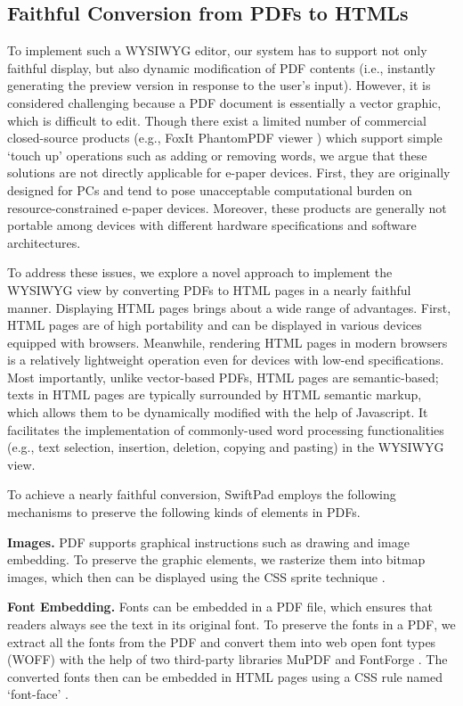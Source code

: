 \documentclass[]{sigchi}
\begin{document}
\subsection{Faithful Conversion from PDFs to HTMLs}
To implement such a WYSIWYG editor, our system has to support not only faithful display, but also dynamic modification of PDF contents (i.e., instantly generating the preview version in response to the user's input). 
However, it is considered challenging because a PDF document is essentially a vector graphic, which is difficult to edit.
Though there exist a limited number of commercial closed-source products (e.g., FoxIt PhantomPDF viewer \cite{foxitreader}) which support simple `touch
up' operations such as adding or removing words, we argue that these solutions are not directly applicable for e-paper devices. First, they are originally designed for PCs and tend to pose unacceptable computational burden on resource-constrained e-paper devices. Moreover, these products are generally not portable among devices with different hardware specifications and software architectures.


To address these issues, we explore a novel approach to implement the WYSIWYG view by converting PDFs to HTML pages in a nearly faithful manner. Displaying HTML pages brings about a wide range of advantages. First, HTML pages are of high portability and can be displayed in various devices equipped with browsers. Meanwhile, rendering HTML pages in modern browsers is a relatively lightweight operation even for devices with low-end specifications. Most importantly, unlike vector-based PDFs, HTML pages are semantic-based; texts in HTML pages are typically surrounded by HTML semantic markup, which allows them to be dynamically modified with the help of Javascript. It facilitates the implementation of commonly-used word processing functionalities (e.g., text selection, insertion, deletion, copying and pasting) in the WYSIWYG view.


To achieve a nearly faithful conversion, SwiftPad employs the following mechanisms to preserve the following kinds of elements in PDFs. 

\textbf{Images.} PDF supports graphical instructions such as drawing and image embedding. To preserve the graphic elements, we rasterize them into bitmap images, which then can be displayed using the CSS sprite technique \cite{souders2008high}.

\textbf{Font Embedding.} Fonts can be embedded in a PDF file, which ensures that readers always see the text in its original font. To preserve the fonts in a PDF, we extract all the fonts from the PDF and convert them into web open font types (WOFF) with the help of two third-party libraries MuPDF \cite{mupdf} and FontForge \cite{williams2003font}. The converted fonts then can be embedded in HTML pages using a CSS rule named `font-face' \cite{souders2008high}. 
\end{document}
